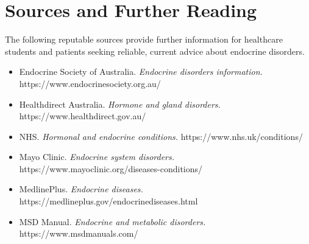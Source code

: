 \section*{Sources and Further Reading}
The following reputable sources provide further information for healthcare students and patients seeking reliable, current advice about endocrine disorders.
\begin{itemize}
    \item Endocrine Society of Australia. \textit{Endocrine disorders information.} https://www.endocrinesociety.org.au/
    \item Healthdirect Australia. \textit{Hormone and gland disorders.} https://www.healthdirect.gov.au/
    \item NHS. \textit{Hormonal and endocrine conditions.} https://www.nhs.uk/conditions/
    \item Mayo Clinic. \textit{Endocrine system disorders.} https://www.mayoclinic.org/diseases-conditions/
    \item MedlinePlus. \textit{Endocrine diseases.} https://medlineplus.gov/endocrinediseases.html
    \item MSD Manual. \textit{Endocrine and metabolic disorders.} https://www.msdmanuals.com/
\end{itemize}

